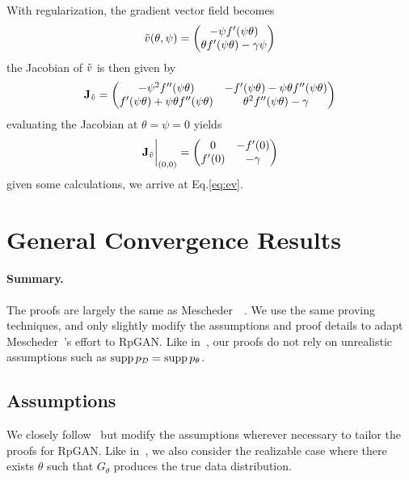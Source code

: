 With regularization, the gradient vector field becomes
\begin{equation}
    \Tilde{v} (\theta, \psi) =
    \begin{pmatrix}
        -\psi f'(\psi\theta) \\
        \theta f'(\psi\theta) - \gamma\psi
    \end{pmatrix}
\end{equation}
the Jacobian of $\Tilde{v}$ is then given by
\begin{equation}
    \textbf{J}_{\Tilde{v}} =
    \begin{pmatrix}
    -\psi^2 f''(\psi\theta) & -f'(\psi\theta) - \psi\theta f''(\psi\theta) \\
    f'(\psi\theta) + \psi\theta f''(\psi\theta) & \theta^2 f''(\psi\theta) - \gamma
    \end{pmatrix}
\end{equation}
evaluating the Jacobian at $\theta = \psi = 0$ yields
\begin{equation}
    \textbf{J}_{\Tilde{v}} \biggr\rvert_{(0, 0)} =
    \begin{pmatrix}
        0 & -f'(0) \\
        f'(0) & -\gamma
    \end{pmatrix}
\end{equation}
given some calculations, we arrive at Eq.\ref{eq:ev}.

\section{General Convergence Results}
\paragraph{Summary.} The proofs are largely the same as Mescheder~\etal~\cite{r1}. We use the same proving techniques, and only slightly modify the assumptions and proof details to adapt Mescheder~\etal's effort to RpGAN. Like in~\cite{r1}, our proofs do not rely on unrealistic assumptions such as $\operatorname{supp} p_\mathcal{D}=\operatorname{supp} p_\theta$.

\subsection{Assumptions}
We closely follow~\cite{r1} but modify the assumptions wherever necessary to tailor the proofs for RpGAN. Like in~\cite{r1}, we also consider the realizable case where there exists $\theta$ such that $G_\theta$ produces the true data distribution.

